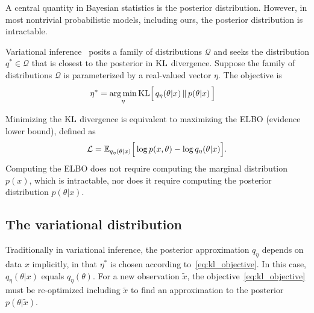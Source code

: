 A central quantity in Bayesian statistics is the posterior distribution. 
However, in most nontrivial probabilistic models, including ours, the posterior distribution is intractable.

Variational inference~\cite{Blei_2017_vi_review, Jordan_intro_vi, Wainwrite_graph_models_vi}
posits a family of distributions $\mathcal{Q}$ and seeks
the distribution $q^*\in \mathcal{Q}$ that is closest to the posterior
in $\textrm{KL}$ divergence. Suppose the family of distributions $\mathcal{Q}$ is parameterized by a real-valued vector $\eta$. The objective is 
\begin{align}
   \eta^* &= \operatorname*{arg\,min}_{\eta} \mathrm{KL}\Big[\,q_\eta(\theta | x)\, \| \,p(\theta | x )\,\Big] 
   \label{eq:kl_objective}
\end{align}

Minimizing the $\textrm{KL}$ divergence is equivalent to maximizing the ELBO (evidence lower bound), defined as 
\begin{align}
    \mathcal{L} = 
    \mathbb{E}_{q_\eta(\theta | x)}\Big[\log p(x, \theta) - \log q_\eta(\theta | x)\Big].
    \label{eq:elbo}
\end{align}
Computing the ELBO does not require computing the marginal distribution $p(x)$, which is intractable, nor does it
require computing the posterior distribution $p(\theta | x)$.

\subsection{The variational distribution}
\label{sec:var_distr}
Traditionally in variational inference, the posterior approximation 
$q_\eta$ depends on data $x$ implicitly, 
in that $\eta^*$ is chosen according to~\eqref{eq:kl_objective}. In this case, $q_\eta(\theta | x)$ equals $q_\eta(\theta)$. For a new observation $\tilde x$, the objective~\eqref{eq:kl_objective} must be re-optimized including $\tilde x$ to find an 
approximation to the posterior $p(\theta | \tilde x)$. 

